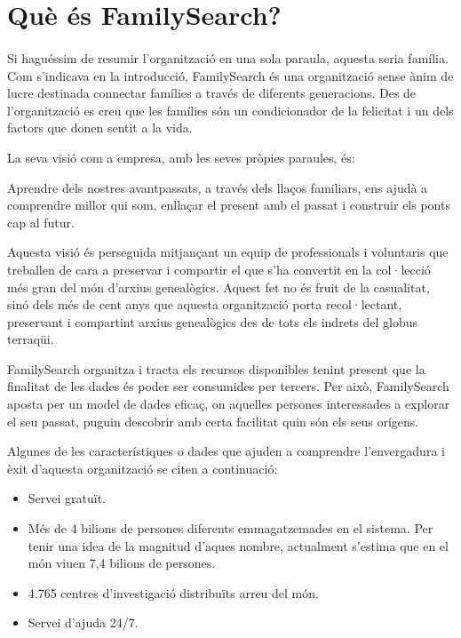 \section{Què és FamilySearch?}

    \paragraph{}
    Si haguéssim de resumir l’organització en una sola paraula, aquesta seria família. Com s’indicava en la introducció, FamilySearch és una organització sense ànim de lucre destinada  connectar famílies a través de diferents generacions. Des de l’organització es creu que les famílies són un condicionador de la felicitat i un dels factors que donen sentit a la vida.

    La seva visió com a empresa, amb les seves pròpies paraules, és:

    \begin{displayquote}
        Aprendre dels nostres avantpassats, a través dels llaços familiars, ens ajudà a comprendre millor qui som, enllaçar el present amb el passat i construir els ponts cap al futur.
    \end{displayquote}

    Aquesta visió és perseguida mitjançant un equip de professionals i voluntaris que treballen de cara a preservar i compartir el que s'ha convertit en la col·lecció més gran del món d'arxius genealògics. Aquest fet no és fruit de la casualitat, sinó dels més de cent anys que aquesta organització porta recol·lectant, preservant i compartint arxius genealògics des de tots els indrets del globus terraqüi.

    FamilySearch organitza i tracta els recursos disponibles tenint present que la finalitat de les dades és poder ser consumides per tercers. Per això, FamilySearch aposta per un model de dades eficaç, on aquelles persones interessades a explorar el seu passat, puguin descobrir amb certa facilitat quin són els seus orígens.

    Algunes de les característiques o dades que ajuden a comprendre l'envergadura i èxit d’aquesta organització se citen a continuació:

    \begin{itemize}
        \item Servei gratuït.
        \item Més de 4 bilions de persones diferents emmagatzemades en el sistema. Per tenir una idea de la magnitud d'aques nombre, actualment s’estima que en el món viuen 7,4 bilions de persones.
        \item 4.765 centres d’investigació distribuïts arreu del món.
        \item Servei d'ajuda 24/7.
    \end{itemize}
